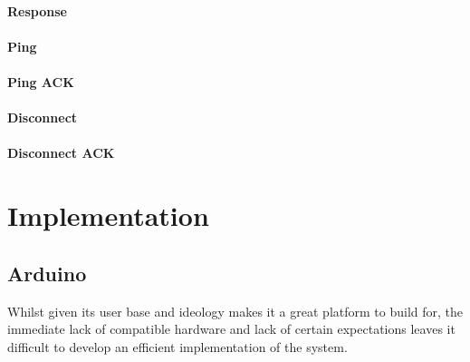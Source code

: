 \documentclass{l4proj}
\begin{document}
\subsubsection{Response} %
\label{ssub:response}


\subsubsection{Ping} %
\label{ssub:ping}


\subsubsection{Ping ACK} %
\label{ssub:ping_ack}


\subsubsection{Disconnect} %
\label{ssub:disconnect}


\subsubsection{Disconnect ACK} %
\label{ssub:disconnect_ack}











\chapter{Implementation} %
\label{cha:implementation}

\section{Arduino} %
\label{sec:arduino}
Whilst given its user base and ideology makes it a great platform to build for, the immediate lack of compatible hardware and lack of certain expectations leaves it difficult to develop an efficient implementation of the system.
\end{document}
